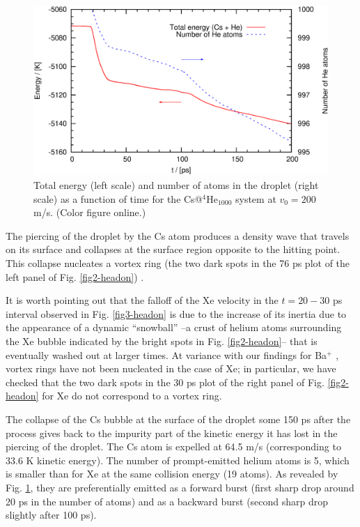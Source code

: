 
\begin{figure}[!]
\centerline{\includegraphics[width=0.90\linewidth,clip]{fig5}}
\caption{\label{fig5-headon} 
Total energy  (left scale) and number of atoms in the droplet (right scale) as a function of time for the 
Cs@$^4$He$_{1000}$ system at $v_0 = 200$ m/s. (Color figure online.)
}
\end{figure}

 
 The piercing of the droplet by the Cs atom produces a density wave that travels on its surface and collapses at the surface region opposite to the hitting point.
 This collapse nucleates a 
 vortex ring (the two dark spots in the 76 ps plot of the left panel of Fig. \ref{fig2-headon}) \citep{Lea14}.
 
 It is worth pointing out that the falloff of the Xe velocity in the $t=20-30$ ps interval observed in Fig. \ref{fig3-headon}  is due to the increase of its inertia
due to the appearance of a dynamic ``snowball''  --a crust of helium atoms surrounding the Xe bubble indicated by the bright spots in 
Fig. \ref{fig2-headon}-- that is eventually washed out at larger times.
At variance with our findings for Ba$^+$ \citep{Mat14}, vortex rings have not been nucleated in the case of Xe; in particular, we have checked that the two dark spots  in the 30 ps plot of the right panel of Fig. \ref{fig2-headon} for Xe do not correspond to a vortex ring. 

The collapse of the Cs bubble at the surface of the droplet some 150 ps after the process 
 gives back to the impurity part of the kinetic energy it has lost  in the 
 piercing of the droplet. The Cs atom is expelled at 64.5 m/s (corresponding to 33.6 K kinetic energy). 
The number of prompt-emitted helium atoms is 5, which is smaller than for Xe at the same collision energy (19 atoms).
As revealed by Fig. \ref{fig5-headon}, they are  preferentially emitted as a forward  burst  (first sharp drop around 20 ps in the number of atoms) and as a 
backward burst  (second sharp drop slightly after 100 ps).